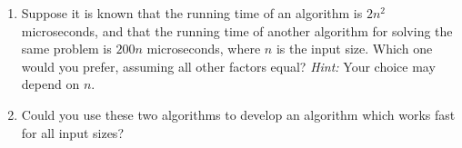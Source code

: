 \begin{enumerate}

\item  Suppose it is known that the running time of an algorithm is
$2n^2$ microseconds, and that the running time of another algorithm
for solving the same problem is $200n$ microseconds, where $n$ is the
input size. Which one would you prefer, assuming all other factors
equal?  {\em Hint:} Your choice may depend on $n$.

\item  Could you use these two algorithms to develop an algorithm
which works fast for all input sizes? 

\end{enumerate}


